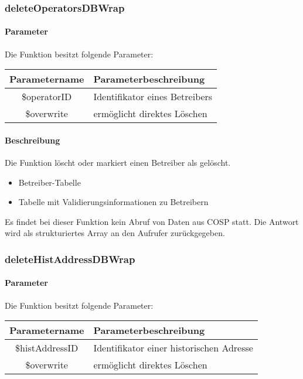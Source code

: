 \subsubsection{deleteOperatorsDBWrap}
\paragraph{Parameter} Die Funktion besitzt folgende Parameter:
\begin{table}[H]
	\begin{tabular}{|c|p{11cm}|}
		\hline
		\textbf{Parametername} & \textbf{Parameterbeschreibung} \\ \hline
		\$operatorID & Identifikator eines Betreibers \\ \hline
		\$overwrite  & ermöglicht direktes Löschen \\ \hline
	\end{tabular}
\end{table}
\paragraph{Beschreibung} Die Funktion löscht oder markiert einen Betreiber als gelöscht.
\begin{itemize}
	\item Betreiber-Tabelle
	\item Tabelle mit Validierungsinformationen zu Betreibern
\end{itemize}
Es findet bei dieser Funktion kein Abruf von Daten aus {\glqq COSP\grqq} statt. Die Antwort wird als strukturiertes Array an den Aufrufer zurückgegeben.
\subsubsection{deleteHistAddressDBWrap}
\paragraph{Parameter} Die Funktion besitzt folgende Parameter:
\begin{table}[H]
	\begin{tabular}{|c|p{11cm}|}
		\hline
		\textbf{Parametername} & \textbf{Parameterbeschreibung} \\ \hline
		\$histAddressID & Identifikator einer historischen Adresse \\ \hline
		\$overwrite     & ermöglicht direktes Löschen \\ \hline
	\end{tabular}
\end{table}
